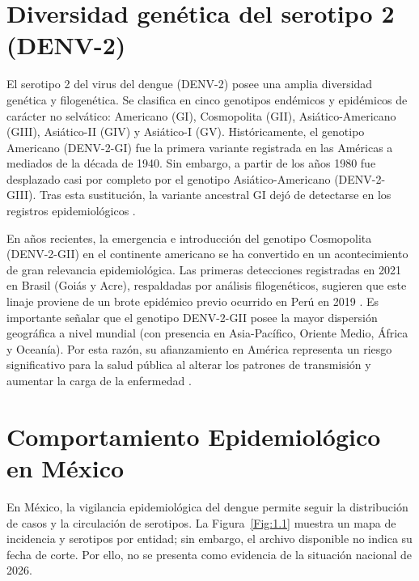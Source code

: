 \section{Diversidad genética del serotipo 2 (DENV-2)}
El serotipo 2 del virus del dengue (DENV-2) posee una amplia diversidad genética y filogenética. Se clasifica en cinco genotipos endémicos y epidémicos de carácter no selvático: Americano (GI), Cosmopolita (GII), Asiático-Americano (GIII), Asiático-II (GIV) y Asiático-I (GV). Históricamente, el genotipo Americano (DENV-2-GI) fue la primera variante registrada en las Américas a mediados de la década de 1940. Sin embargo, a partir de los años 1980 fue desplazado casi por completo por el genotipo Asiático-Americano (DENV-2-GIII). Tras esta sustitución, la variante ancestral GI dejó de detectarse en los registros epidemiológicos \cite{allicock2012phylogeography}.

En años recientes, la emergencia e introducción del genotipo Cosmopolita (DENV-2-GII) en el continente americano se ha convertido en un acontecimiento de gran relevancia epidemiológica. Las primeras detecciones registradas en 2021 en Brasil (Goiás y Acre), respaldadas por análisis filogenéticos, sugieren que este linaje proviene de un brote epidémico previo ocurrido en Perú en 2019 \cite{amorim2023emergence}. Es importante señalar que el genotipo DENV-2-GII posee la mayor dispersión geográfica a nivel mundial (con presencia en Asia-Pacífico, Oriente Medio, África y Oceanía). Por esta razón, su afianzamiento en América representa un riesgo significativo para la salud pública al alterar los patrones de transmisión y aumentar la carga de la enfermedad \cite{amorim2023emergence}. 
\section{Comportamiento Epidemiológico en México}
En México, la vigilancia epidemiológica del dengue permite seguir la distribución de casos y la circulación de serotipos. La Figura~\ref{Fig:1.1} muestra un mapa de incidencia y serotipos por entidad; sin embargo, el archivo disponible no indica su fecha de corte. Por ello, no se presenta como evidencia de la situación nacional de 2026.

